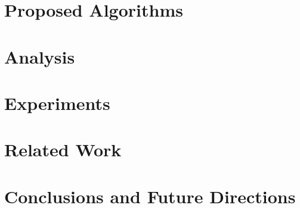 \documentclass[letterpaper]{article} %
\newcommand{\todob}[2][]{\todo[color=cyan!20,size=\tiny,inline,#1]{B: #2}} %
\begin{document}

\section{Proposed Algorithms}
\label{algo}


\section{Analysis}
\label{analysis}


\section{Experiments}
\label{expt}


\section{Related Work}
\label{related}


\section{Conclusions and Future Directions}
\label{conclusions}




\newpage




\appendix

\end{document}
